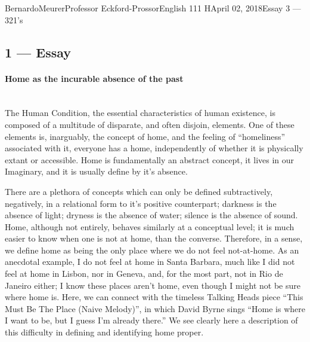 \documentclass[12pt,letterpaper]{article}
\begin{document}
\begin{mla}{Bernardo}{Meurer}{Professor Eckford-Prossor}{English 111 H}{April 02, 2018}{Essay 3 --- 321's}
    \subsection*{1 --- Essay}
    \paragraph*{Home as the incurable absence of the past}  \hspace{0pt} \\
    The Human Condition, the essential characteristics of human existence, is composed of a multitude of disparate, and often disjoin, elements. One of these elements is, inarguably, the concept of home, and the feeling of ``homeliness'' associated with it, everyone has a home, independently of whether it is physically extant or accessible. Home is fundamentally an abstract concept, it lives in our Imaginary, and it is usually define by it's absence.

    There are a plethora of concepts which can only be defined subtractively, negatively, in a relational form to it's positive counterpart; darkness is the absence of light; dryness is the absence of water; silence is the absence of sound. Home, although not entirely, behaves similarly at a conceptual level; it is much easier to know when one is not at home, than the converse. Therefore, in a sense, we define home as being the only place where we do not feel not-at-home.
As an anecdotal example, I do not feel at home in Santa Barbara, much like I did not feel at home in Lisbon, nor in Geneva, and, for the most part, not in Rio de Janeiro either; I know these places aren't home, even though I might not be sure where home is.
Here, we can connect with the timeless Talking Heads piece ``This Must Be The Place (Naive Melody)'', in which David Byrne sings ``Home is where I want to be, but I guess I'm already there.'' We see clearly here a description of this difficulty in defining and identifying home proper.


\end{mla}
\end{document}
